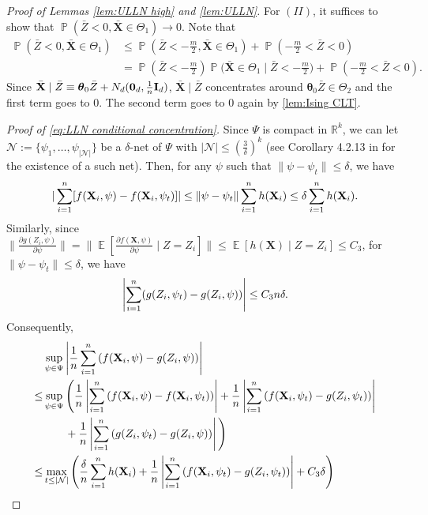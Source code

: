 \documentclass[preprint,reqno]{imsart}
\newcommand{\ttheta}{\boldsymbol{\theta}}
\newcommand{\I}{\mathbf{I}_{\mathnormal{d}}}
\DeclareMathOperator{\EE}{\mathbb{E}}
\DeclareMathOperator{\PP}{\mathbb{P}}
\newcommand{\X}{\mathbf{X}}
\DeclareMathOperator{\sumin}{\sum_{\mathnormal i=1}^{\mathnormal n}}
\begin{document}
\begin{appendix}
\begin{proof}[Proof of Lemmas \ref{lem:ULLN high} and \ref{lem:ULLN}]
    For $(II)$, it suffices to show that $\PP( \bar{Z} < 0, \bar{\X} \in \Theta_1) \to 0$. %
    Note that
    \begin{align*}
        \PP(\bar{Z} < 0, \bar{\X} \in \Theta_1) &\le \PP(\bar{Z} < - \frac{m}{2}, \bar{\X} \in \Theta_1) + \PP( - \frac{m}{2} < \bar{Z} < 0) \\
        &= \PP(\bar{Z} < - \frac{m}{2}) \PP\Big(\bar{\X} \in \Theta_1 \mid \bar{Z} < - \frac{m}{2}\Big) + \PP( - \frac{m}{2} < \bar{Z} < 0).
    \end{align*}
    Since $\bar{\X} \mid \bar{Z} \equiv \ttheta_0 \bar{Z} + N_d(\mathbf{0}_d, \frac{1}{n} \I)$, $\bar{\X} \mid \bar{Z}$ concentrates around $\ttheta_0 \bar{Z} \in \Theta_2$ and the first term goes to $0$. The second term goes to 0 again by \cref{lem:Ising CLT}. %

    \vspace{2mm}
    \emph{Proof of \eqref{eq:LLN conditional concentration}.} Since $\Psi$ is compact in $\mathbb{R}^k$, we can let $\mathcal{N} := \{\psi_1, \ldots, \psi_{|\mathcal{N}|}\}$ be a $\delta$-net of $\Psi$ with $|\mathcal{N}| \le \left(\frac{3}{\delta}\right)^k$ (see Corollary 4.2.13 in \cite{vershynin2018high} for the existence of a such net). Then, for any $\psi$ such that $\|\psi - \psi_t\| \le \delta$, we have
    $$|\sumin [f(\X_i, \psi) - f(\X_i, \psi_t)]| \le \| \psi - \psi_t \| \sumin h(\X_i) \le \delta \sumin h(\X_i).$$
    Similarly, since $\lVert  \frac{\partial g(Z_i, \psi)}{\partial \psi} \rVert = \lVert \EE [\frac{\partial f(\X, \psi)}{\partial \psi} \mid Z = Z_i]\rVert \le \EE [h(\X) \mid Z = Z_i] \le C_3$, for $\|\psi - \psi_t\| \le \delta$, we have
    $$\left| \sumin (g(Z_i, \psi_t) - g(Z_i, \psi)) \right| \le C_3 n \delta.$$
    Consequently, 
    \begin{align*}
        &\sup_{\psi \in \Psi} \left| \frac{1}{n} \sumin \left( f(\X_i, \psi) -g(Z_i, \psi) \right) \right| \\
        \le &\sup_{\psi \in \Psi} \Bigg( \frac{1}{n}\left|  \sumin \left( f(\X_i, \psi) - f(\X_i, \psi_t) \right)\right| + \frac{1}{n}\left|  \sumin \left( f(\X_i, \psi_t) - g(Z_i, \psi_t) \right) \right| \\
        & \quad \quad + \frac{1}{n}\left| \sumin \left( g(Z_i, \psi_t) - g(Z_i, \psi) \right) \right|\Bigg) \\
        \le & \max_{t \le |\mathcal{N}|} \left(\frac{\delta}{n} \sumin h(\X_i) + \frac{1}{n}\left|  \sumin \left( f(\X_i, \psi_t) - g(Z_i, \psi_t) \right) \right| + C_3 \delta \right) \\

\end{align*}
\end{proof}
\end{appendix}
\end{document}
